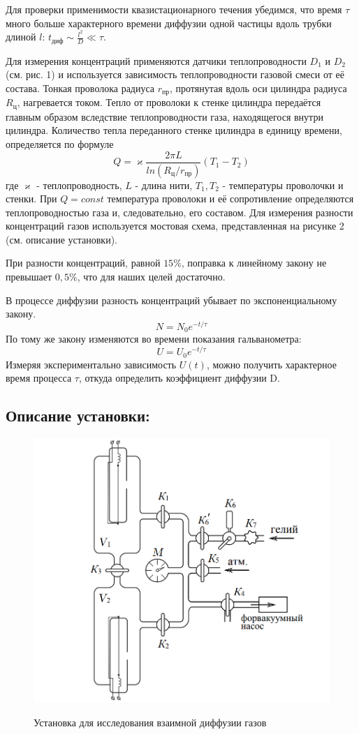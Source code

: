 \documentclass[a4paper,12pt]{article}
\begin{document}
Для проверки применимости квазистационарного течения убедимся, что время $\tau$ много больше характерного времени диффузии одной частицы вдоль трубки длиной $l$: $t_{\text{диф}} \sim \frac{l^2}{D} \ll \tau$.

 Для измерения концентраций применяются датчики теплопроводности $D_1$ и $D_2$ (см. рис. 1) и используется зависимость теплопроводности газовой смеси от её состава. Тонкая проволока радиуса $r_{\text{пр}}$, протянутая вдоль оси цилиндра радиуса $R_{\text{ц}}$, нагревается током. Тепло от проволоки к стенке цилиндра передаётся главным образом вследствие теплопроводности газа, находящегося внутри цилиндра. Количество тепла переданного стенке цилиндра в единицу времени, определяется по формуле 
\begin{equation}
Q = \varkappa \frac{2\pi L}{ln (R_{\text{ц}}/r_{\text{пр}})}(T_1-T_2)
\end{equation}
где $\varkappa$ - теплопроводность, $L$ - длина нити, $T_1, T_2$ - температуры проволочки и стенки. При $Q = const$ температура проволоки и её сопротивление определяются теплопроводностью газа и, следовательно, его составом. Для измерения разности концентраций газов используется  
мостовая схема, представленная на рисунке 2 (см. описание установки).
	 
	 При разности концентраций, равной $15\%$, поправка к линейному закону не превышает $0,5\%$, что для наших целей достаточно.
	 
 В процессе диффузии разность концентраций убывает по экспоненциальному закону.
 \begin{equation}
N = N_0e^{-t/\tau}
\end{equation}
 По тому же закону изменяются во времени показания гальванометра:
\begin{equation}
U = U_0e^{-t/\tau}
\end{equation}
Измеряя экспериментально зависимость $U(t)$, можно получить характерное время процесса $\tau$, откуда определить коэффициент диффузии D.

\subsection{Описание установки:}
\begin{figure}[h]
\begin{center}
\includegraphics[width=0.5\linewidth]{ustanovka_graph.png}
\label{ris:ustanovka_1} 
\caption{Установка для исследования взаимной диффузии газов}
\end{center}
\end{figure}
\end{document}
